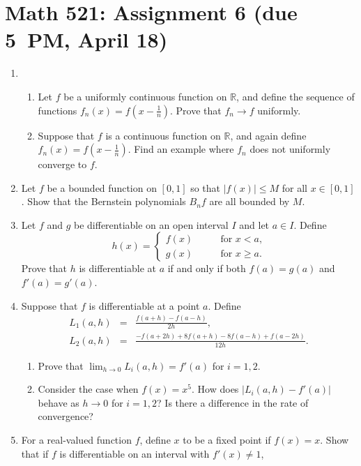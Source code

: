 \documentclass[12pt]{article}
\newcommand{\R}{\mathbb{R}}
\begin{document}
\section*{Math 521: Assignment 6 (due 5~PM, April 18)}
\begin{enumerate}
  \item
    \begin{enumerate}
      \item Let $f$ be a uniformly continuous function on $\R$, and define the sequence of functions $f_n(x) = f(x-\tfrac1n)$. Prove that $f_n \to f$ uniformly.
      \item Suppose that $f$ is a continuous function on $\R$, and again define $f_n(x)=f(x-\tfrac1n)$. Find an example where $f_n$ does not uniformly converge to $f$.
    \end{enumerate}
  \item Let $f$ be a bounded function on $[0,1]$ so that $|f(x)| \le M$ for all
    $x\in [0,1]$. Show that the Bernstein polynomials $B_n f$ are all bounded
    by $M$.
      \item Let $f$ and $g$ be differentiable on an open interval $I$ and let $a\in I$. Define
    \begin{equation}
      h(x) = \begin{cases}
        f(x) & \qquad \text{for $x<a$,} \\
        g(x) & \qquad \text{for $x\ge a$.}
      \end{cases}
    \end{equation}
    Prove that $h$ is differentiable at $a$ if and only if both $f(a)=g(a)$ and
    $f'(a)=g'(a)$.
  \item
    Suppose that $f$ is differentiable at a point $a$. Define
    \begin{eqnarray*}
      L_1(a,h) &=& \frac{f(a+h)-f(a-h)}{2h}, \\
      L_2(a,h) &=& \frac{-f(a+2h)+8f(a+h)-8f(a-h)+f(a-2h)}{12h}.
    \end{eqnarray*}
    \begin{enumerate}
      \item Prove that $\lim_{h\to 0} L_i(a,h)=f'(a)$ for $i=1,2$.
      \item Consider the case when $f(x)=x^5$. How does $|L_i(a,h)-f'(a)|$
	behave as $h \to 0$ for $i=1,2$? Is there a difference in the rate
	of convergence?
    \end{enumerate}
  \item For a real-valued function $f$, define $x$ to be a fixed point if
    $f(x)=x$. Show that if $f$ is differentiable on an interval with $f'(x)\ne 1$,

\end{enumerate}
\end{document}
